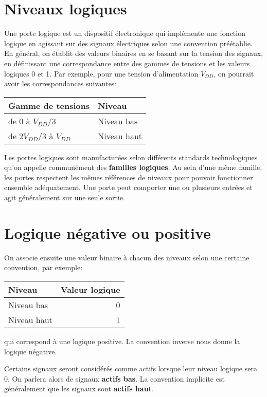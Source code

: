 \documentclass[letter, oneside]{book}
\begin{document}
\section{Niveaux logiques}
\label{sec:org63e8108}

Une porte logique est un dispositif électronique qui implémente une
fonction logique en agissant sur des signaux électriques selon une
convention préétablie. En général, on établit des valeurs binaires en
se basant sur la tension des signaux, en définissant une
correspondance entre des gammes de tensions et les valeurs logiques 0
et 1. Par exemple, pour une tension d'alimentation \(V_{DD}\), on
pourrait avoir les correspondances suivantes:

\begin{center}
\begin{tabular}{ll}
Gamme de tensions & Niveau\\[0pt]
\hline
de 0 à  \(V_{DD}/3\) & Niveau bas\\[0pt]
de \(2V_{DD}/3\) à  \(V_{DD}\) & Niveau haut\\[0pt]
\end{tabular}
\end{center}

Les portes logiques sont manufacturées selon différents standards
technologiques qu'on appelle communément des \textbf{familles logiques}. Au
sein d'une même famille, les portes respectent les mêmes références de
niveaux pour pouvoir fonctionner ensemble adéquatement. Une porte peut
comporter une ou plusieurs entrées et agit généralement sur une seule
sortie.

\section{Logique négative ou positive}
\label{sec:orgfd1ecd5}

On associe ensuite une valeur binaire à chacun des niveaux selon une
certaine convention, par exemple:
\begin{center}
\begin{tabular}{lr}
Niveau & Valeur logique\\[0pt]
\hline
Niveau bas & 0\\[0pt]
Niveau haut & 1\\[0pt]
\end{tabular}
\end{center}
qui correspond à une logique positive. La convention inverse nous
donne la logique négative.

Certains signaux seront considérés comme actifs lorsque leur niveau
logique sera 0. On parlera alors de signaux \textbf{actifs bas}. La
convention implicite est généralement que les signaux sont \textbf{actifs
haut}.
\end{document}

